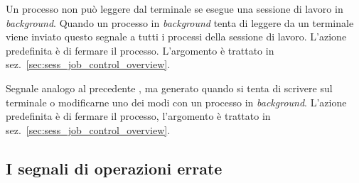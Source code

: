 \begin{basedescript}{\desclabelwidth{2.0cm}}
\item[\signald{SIGTTIN}] Un processo non può leggere dal terminale se esegue
  una sessione di lavoro in \textit{background}. Quando un processo in
  \textit{background} tenta di leggere da un terminale viene inviato questo
  segnale a tutti i processi della sessione di lavoro. L'azione predefinita è
  di fermare il processo.  L'argomento è trattato in
  sez.~\ref{sec:sess_job_control_overview}.

\item[\signald{SIGTTOU}] Segnale analogo al precedente , ma
  generato quando si tenta di scrivere sul terminale o modificarne uno dei
  modi con un processo in \textit{background}. L'azione predefinita è di
  fermare il processo, l'argomento è trattato in
  sez.~\ref{sec:sess_job_control_overview}.
\end{basedescript}


\subsection{I segnali di operazioni errate}
\label{sec:sig_oper_error}

